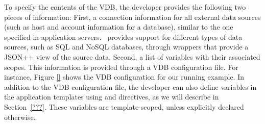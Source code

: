   To specify the contents of the VDB, the developer provides the following two pieces of information: First, a connection information for all external data sources (such as host and account information for a database), similar to the one specified in application servers. \projname\ provides support for different types of data sources, such as SQL and NoSQL databases, through wrappers that provide a JSON++ view of the source data.
Second, a list of variables with their associated scopes. This information is provided through a VDB configuration file. For instance, Figure \ref{}  shows the VDB configuration for our running example.  
In addition to the VDB configuration file, the developer can also define variables in the application templates using  and  directives, as we will describe in Section~\ref{???}. These variables are template-scoped, unless explicitly declared otherwise.\\




